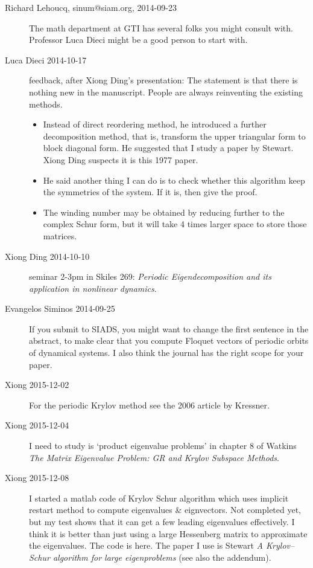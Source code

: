 \begin{description}
\item[Richard Lehoucq, sinum@siam.org, 2014-09-23]
The math department at GTI has several folks you might consult with.
Professor  {Luca Dieci}
might be a good person to start with.

\item[Luca Dieci 2014-10-17] feedback, after Xiong Ding's presentation:
The statement is that there is nothing new in the manuscript. People are
always reinventing the existing methods.
\begin{itemize}
\item Instead of
  direct reordering method, he introduced a further decomposition method,
  that is, transform the upper triangular form to block diagonal form. He
  suggested that I study a paper by Stewart. Xiong Ding suspects it is
  this 1977 paper.
\item He said another thing I can do is to check whether this algorithm
  keep the symmetries of the system. If it is, then give the proof.
\item The winding number may be obtained by reducing further to the
  complex Schur form, but it will take 4 times larger space to store
  those matrices.
\end{itemize}


\item[Xiong Ding 2014-10-10]
seminar 2-3pm in Skiles 269:
{\em Periodic Eigendecomposition and its application in nonlinear dynamics}.


\item[Evangelos Siminos 2014-09-25]
If you submit to SIADS, you might want to change the first
sentence in the abstract, to make clear that you compute Floquet
vectors of periodic orbits of dynamical systems. I also think
the journal has the right scope for your paper.

\item[Xiong 2015-12-02]
For the periodic Krylov method see the 2006 article by
Kressner.

\item[Xiong 2015-12-04]
I need to study  is `product eigenvalue problems' in chapter 8 of
Watkins {\em The Matrix Eigenvalue Problem: GR and Krylov
Subspace Methods}.

\item[Xiong 2015-12-08]
I started a matlab code of Krylov Schur algorithm which uses implicit
restart method to compute eigenvalues \& eignvectors. Not completed yet,
but my test shows that it can get a few leading eigenvalues effectively.
I think it is better than just using a large Hessenberg matrix to
approximate the eigenvalues. The code is
 {here}. The paper I use
is Stewart {\em A {Krylov--Schur} algorithm for large
eigenproblems} (see also the addendum).


\end{description}
